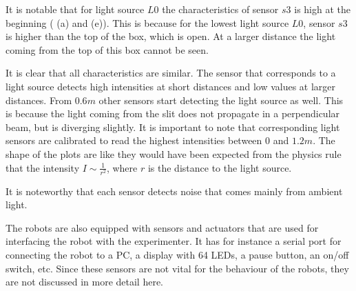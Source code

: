 \begin{description}
It is notable that for light source $L0$ the characteristics of sensor $s3$ is high at the beginning ( (a) and (e)). This is because for the lowest light source $L0$, sensor $s3$ is higher than the top of the box, which is open. At a larger distance the light coming from the top of this box cannot be seen. 

It is clear that all characteristics are similar. The sensor that corresponds to a light source detects high intensities at short distances and low values at larger distances. From $0.6 m$ other sensors start detecting the light source as well. This is because the light coming from the slit does not propagate in a perpendicular beam, but is diverging slightly. It is important to note that corresponding light sensors are calibrated to read the highest intensities between $0$ and $1.2 m$. The shape of the plots are like they would have been expected from the physics rule that the intensity $I \sim \frac{1}{r^2}$, where $r$ is the distance to the light source.

It is noteworthy that each sensor detects noise that comes mainly from ambient light.
\end{description}

The robots are also equipped with sensors and actuators that are used for interfacing the robot with the experimenter. It has for instance a serial port for connecting the robot to a PC, a display with 64 LEDs, a pause button, an on/off switch, etc. Since these sensors are not vital for the behaviour of the robots, they are not discussed in more detail here. 


